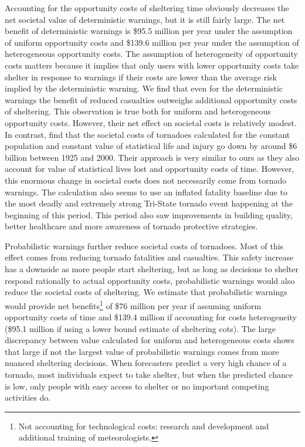 \documentclass{ametsocV6.1}
\begin{document}
Accounting for the opportunity costs of sheltering time obviously decreases the net societal value of deterministic warnings, but it is still fairly large. The net benefit of deterministic warnings is \$95.5 million per year under the assumption of uniform opportunity costs and \$139.6 million per year under the assumption of heterogeneous opportunity costs. The assumption of heterogeneity of opportunity costs matters because it implies that only users with lower opportunity costs take shelter in response to warnings if their costs are lower than the average risk implied by the deterministic warning. We find that even for the deterministic warnings the benefit of reduced casualties outweighs additional opportunity costs of sheltering. This observation is true both for uniform and heterogeneous opportunity costs. However, their net effect on societal costs is relatively modest.  In contrast, \citet{simmons_economic_2013} find that the societal costs of tornadoes calculated for the constant population and constant value of statistical life and injury go down by around \$6 billion between 1925 and 2000. Their approach is very similar to ours as they also account for value of statistical lives lost and opportunity costs of time. However, this enormous change in societal costs does not necessarily come from tornado warnings. The calculation also seems to use an inflated fatality baseline due to the most deadly and extremely strong Tri-State tornado event happening at the beginning of this period. This period also saw improvements in building quality, better healthcare and more awareness of tornado protective strategies.

Probabilistic warnings further reduce societal costs of tornadoes. Most of this effect comes from reducing tornado fatalities and casualties. This safety increase has a downside as more people start sheltering, but as long as decisions to shelter respond rationally to actual opportunity costs, probabilistic warnings would also reduce the societal costs of sheltering. We estimate that probabilistic warnings would provide net benefits\footnote{Not accounting for technological costs: research and development and additional training of meteorologists.} of \$76 million per year if assuming uniform opportunity costs of time and \$139.4 million if accounting for costs heterogeneity (\$95.1 million if using a lower bound estimate of sheltering cots). The large discrepancy between value calculated for uniform and heterogeneous costs shows that large if not the largest value of probabilistic warnings comes from more nuanced sheltering decisions. When forecasters predict a very high chance of a tornado, most individuals expect to take shelter, but when the predicted chance is low, only people with easy access to shelter or no important competing activities do. 
\end{document}

